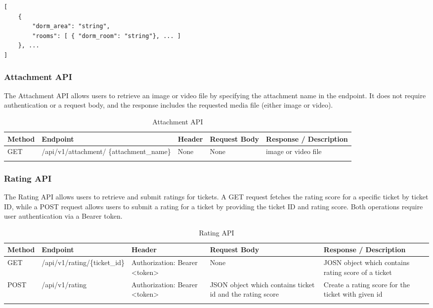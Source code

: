 \begin{lstlisting}[breaklines=true, caption=Dormitory Schema]
[
	{
		"dorm_area": "string",
		"rooms": [ { "dorm_room": "string"}, ... ]
	}, ...
]
\end{lstlisting}



\subsubsection{Attachment API}
The Attachment API allows users to retrieve an image or video file by specifying the attachment name in the endpoint. It does not require authentication or a request body, and the response includes the requested media file (either image or video).
\begin{longtable}{|m{1.6cm}|m{5cm}|m{3cm}|m{3cm}|m{3.2cm}|}
	\hline
	\textbf{Method} & \textbf{Endpoint} & \textbf{Header}                                                                                                                            & \textbf{Request Body} & \textbf{Response / Description}   \\ \hline
	\endhead
	
	GET & /api/v1/attachment/ \newline \{attachment\_name\} & None & None & image or video file \\ \hline
	
	
	\caption{Attachment API}
	\label{tab:attachment-api}
	
\end{longtable}



\subsubsection{Rating API}
The Rating API allows users to retrieve and submit ratings for tickets. A GET request fetches the rating score for a specific ticket by ticket ID, while a POST request allows users to submit a rating for a ticket by providing the ticket ID and rating score. Both operations require user authentication via a Bearer token.

\begin{longtable}{|m{1.6cm}|m{5cm}|m{3cm}|m{3cm}|m{3.2cm}|}
	\hline
	\textbf{Method} & \textbf{Endpoint} & \textbf{Header}                                                                                                                            & \textbf{Request Body} & \textbf{Response / Description}   \\ \hline
	\endhead
	
	GET & /api/v1/rating/\{ticket\_id\} & Authorization: Bearer <token>  & None & JOSN object which contains rating score of a ticket\\ \hline
	
	POST & /api/v1/rating & Authorization: Bearer <token>  & JSON object which contains ticket id and the rating score & Create a rating score for the ticket with given id\\ \hline
	
	
	\caption{Rating API}
	\label{tab:rating-api}
	
\end{longtable}


